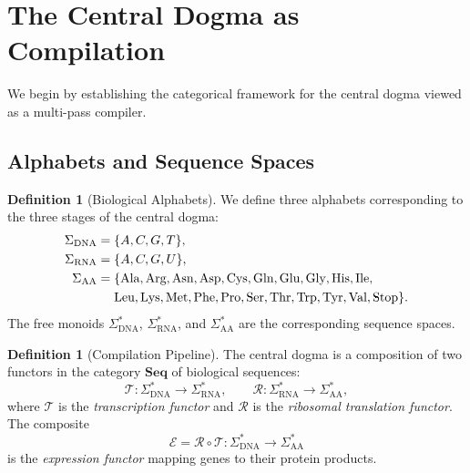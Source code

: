 \documentclass[12pt,a4paper]{article}
\theoremstyle{definition}
\newtheorem{definition}[theorem]{Definition}
\newcommand{\cat}[1]{\mathbf{#1}}
\begin{document}
\section{The Central Dogma as Compilation}\label{sec:compilation}

We begin by establishing the categorical framework for the central dogma viewed as a multi-pass compiler.

\subsection{Alphabets and Sequence Spaces}

\begin{definition}[Biological Alphabets]\label{def:alphabets}
We define three alphabets corresponding to the three stages of the central dogma:
\begin{align}
  \Sigma_{\mathrm{DNA}} &= \{A, C, G, T\}, \\
  \Sigma_{\mathrm{RNA}} &= \{A, C, G, U\}, \\
  \Sigma_{\mathrm{AA}}  &= \{\text{Ala}, \text{Arg}, \text{Asn}, \text{Asp}, \text{Cys},
     \text{Gln}, \text{Glu}, \text{Gly}, \text{His}, \text{Ile}, \notag\\
     &\quad\ \text{Leu}, \text{Lys}, \text{Met}, \text{Phe}, \text{Pro},
     \text{Ser}, \text{Thr}, \text{Trp}, \text{Tyr}, \text{Val}, \text{Stop}\}.
\end{align}
The free monoids $\Sigma_{\mathrm{DNA}}^*$, $\Sigma_{\mathrm{RNA}}^*$, and $\Sigma_{\mathrm{AA}}^*$ are the corresponding sequence spaces.
\end{definition}

\begin{definition}[Compilation Pipeline]\label{def:pipeline}
The central dogma is a composition of two functors in the category $\cat{Seq}$ of biological sequences:
\[
  \mathcal{T} \colon \Sigma_{\mathrm{DNA}}^* \to \Sigma_{\mathrm{RNA}}^*, \qquad
  \mathcal{R} \colon \Sigma_{\mathrm{RNA}}^* \to \Sigma_{\mathrm{AA}}^*,
\]
where $\mathcal{T}$ is the \emph{transcription functor} and $\mathcal{R}$ is the \emph{ribosomal translation functor}. The composite
\[
  \mathcal{E} = \mathcal{R} \circ \mathcal{T} \colon \Sigma_{\mathrm{DNA}}^* \to \Sigma_{\mathrm{AA}}^*
\]
is the \emph{expression functor} mapping genes to their protein products.
\end{definition}
\end{document}
